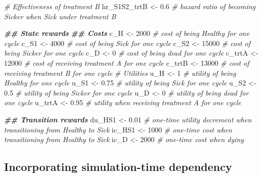 \documentclass[
]{article}
\newenvironment{Shaded}{\begin{snugshade}}{\end{snugshade}}
\newcommand{\CommentTok}[1]{\textcolor[rgb]{0.56,0.35,0.01}{\textit{#1}}}
\newcommand{\DecValTok}[1]{\textcolor[rgb]{0.00,0.00,0.81}{#1}}
\newcommand{\DocumentationTok}[1]{\textcolor[rgb]{0.56,0.35,0.01}{\textbf{\textit{#1}}}}
\newcommand{\FloatTok}[1]{\textcolor[rgb]{0.00,0.00,0.81}{#1}}
\newcommand{\NormalTok}[1]{#1}
\newcommand{\OtherTok}[1]{\textcolor[rgb]{0.56,0.35,0.01}{#1}}
\begin{document}
\begin{Shaded}
\begin{Highlighting}[]
\CommentTok{\# Effectiveness of treatment B}
\NormalTok{hr\_S1S2\_trtB }\OtherTok{\textless{}{-}} \FloatTok{0.6} \CommentTok{\# hazard ratio of becoming Sicker when Sick under treatment B}

\DocumentationTok{\#\# State rewards}
\DocumentationTok{\#\# Costs}
\NormalTok{c\_H    }\OtherTok{\textless{}{-}} \DecValTok{2000}  \CommentTok{\# cost of being Healthy for one cycle }
\NormalTok{c\_S1   }\OtherTok{\textless{}{-}} \DecValTok{4000}  \CommentTok{\# cost of being Sick for one cycle }
\NormalTok{c\_S2   }\OtherTok{\textless{}{-}} \DecValTok{15000} \CommentTok{\# cost of being Sicker for one cycle}
\NormalTok{c\_D    }\OtherTok{\textless{}{-}} \DecValTok{0}     \CommentTok{\# cost of being dead for one cycle}
\NormalTok{c\_trtA }\OtherTok{\textless{}{-}} \DecValTok{12000} \CommentTok{\# cost of receiving treatment A for one cycle}
\NormalTok{c\_trtB }\OtherTok{\textless{}{-}} \DecValTok{13000} \CommentTok{\# cost of receiving treatment B for one cycle }
\CommentTok{\# Utilities}
\NormalTok{u\_H    }\OtherTok{\textless{}{-}} \DecValTok{1}     \CommentTok{\# utility of being Healthy for one cycle }
\NormalTok{u\_S1   }\OtherTok{\textless{}{-}} \FloatTok{0.75}  \CommentTok{\# utility of being Sick for one cycle }
\NormalTok{u\_S2   }\OtherTok{\textless{}{-}} \FloatTok{0.5}   \CommentTok{\# utility of being Sicker for one cycle}
\NormalTok{u\_D    }\OtherTok{\textless{}{-}} \DecValTok{0}     \CommentTok{\# utility of being dead for one cycle}
\NormalTok{u\_trtA }\OtherTok{\textless{}{-}} \FloatTok{0.95}  \CommentTok{\# utility when receiving treatment A for one cycle}

\DocumentationTok{\#\# Transition rewards}
\NormalTok{du\_HS1 }\OtherTok{\textless{}{-}} \FloatTok{0.01}  \CommentTok{\# one{-}time utility decrement when transitioning from Healthy to Sick}
\NormalTok{ic\_HS1 }\OtherTok{\textless{}{-}} \DecValTok{1000}  \CommentTok{\# one{-}time cost when transitioning from Healthy to Sick}
\NormalTok{ic\_D   }\OtherTok{\textless{}{-}} \DecValTok{2000}  \CommentTok{\# one{-}time cost when dying}
\end{Highlighting}
\end{Shaded}

\hypertarget{incorporating-simulation-time-dependency}{%
\subsection{Incorporating simulation-time dependency}\label{incorporating-simulation-time-dependency}}
\end{document}
